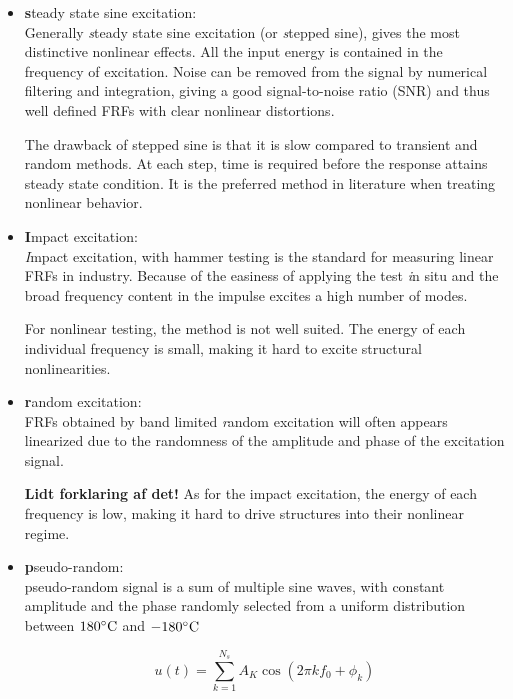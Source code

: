 \begin{itemize}
\item {\textbf steady state sine excitation}:\\
  Generally {\textit steady state sine excitation} (or {\textit stepped sine}), gives
  the most distinctive nonlinear effects. All the input energy is contained in
  the frequency of excitation. Noise can be removed from the signal by numerical
  filtering and integration, giving a good signal-to-noise ratio (SNR) and thus well
  defined FRFs with clear nonlinear distortions.
  
  The drawback of stepped sine is that it is slow compared to transient and
  random methods. At each step, time is required before the response attains
  steady state condition. It is the preferred method in literature when treating
  nonlinear behavior.

\item {\textbf Impact excitation}:\\
  {\textit Impact excitation}, with hammer testing is the standard for measuring
  linear FRFs in industry. Because of the easiness of applying the test {\textit in
    situ} and the broad frequency content in the impulse excites a high number
  of modes.

  For nonlinear testing, the method is not well suited. The energy of each
  individual frequency is small, making it hard to excite structural
  nonlinearities.

\item {\textbf random excitation}:\\
  FRFs obtained by band limited {\textit random excitation} will often appears
  linearized due to the randomness of the amplitude and phase of the excitation
  signal.

  \textbf{Lidt forklaring af det!} As for the impact excitation, the energy of
  each frequency is low, making it hard to drive structures into their nonlinear
  regime.

\item {\textbf pseudo-random}:\\
  pseudo-random signal is a sum of multiple sine waves, with constant amplitude
  and the phase randomly selected from a uniform distribution between $180
  ^\circ \mathrm{C}$ and $-180 ^\circ \mathrm{C}$

  \begin{equation}
    \label{eq:multiple-sine}
    u(t) = \sum_{k=1}^{N_s} A_K \cos \left( 2 \pi k f_0 + \phi_k \right)
  \end{equation}


\end{itemize}

